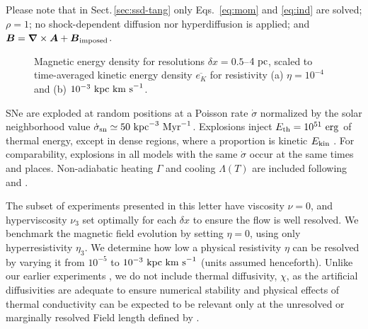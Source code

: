 \documentclass[preprint2]{aastex63}
\newcommand\SNr{\dot\sigma_{\rm sn}}
\newcommand\ESK{E_{\rm kin}}
\newcommand\EST{E_{\rm th}}
\newcommand{\vect}[1]{{{\mbox{\boldmath $#1$}}}}%
\newcommand\kpc{~ {\rm kpc}}
\newcommand\pc{~ {\rm pc}}
\newcommand\dx{ {\delta x}}
\newcommand\Myr{~ {\rm Myr}}
\newcommand\erg{~ {\rm erg}}
\newcommand\kms{~ {\rm km~ s}^{-1}}
\begin{document}
Please note that in Sect.\,\ref{sec:ssd-tang} only Eqs.~\eqref{eq:mom} and
\eqref{eq:ind} are solved; $\rho=1$; no shock-dependent diffusion nor
hyperdiffusion is applied; and $\vect{B}=\vect\nabla\times\vect{A}+
\vect{B}_{\rm imposed}$.

\begin{figure*}
\caption{
 Magnetic energy density for resolutions $\dx=0.5$--$4\pc$,
 scaled to time-averaged kinetic energy density $\overline{e_K}$ for resistivity
 (a) $\eta=10^{-4}$ and (b) $10^{-3}\kpc\kms$.
\label{fig:eb-res}}
\end{figure*}

 SNe are exploded at random positions at a Poisson rate $\dot\sigma$
 normalized by the solar neighborhood value $\SNr\simeq 50\kpc^{-3}\Myr^{-1}$.
 Explosions inject $\EST = 10^{51}\erg$ of thermal energy, except in
 dense regions, where
 a proportion is kinetic $\ESK$ 
 \citep[see][]{GMKSH20}.
 For comparability,
    explosions in all models with the same $\dot\sigma$ occur at the same
    times and places.
 Non-adiabatic heating $\Gamma$ and cooling $\Lambda (T)$ are
 included \citep{Gent:2013a} following \citet{Wolfire:1995} and
 \citet{Sarazin:1987}.

 The subset of experiments presented in this letter have viscosity $\nu=0$,
 and hyperviscosity $\nu_3$ set optimally for each $\dx$ to ensure the flow
 is well resolved.
 We benchmark the magnetic field evolution by setting $\eta=0$, using only
 hyperresistivity $\eta_3$.
 We determine how low a physical resistivity $\eta$ can be resolved by varying
 it from $10^{-5}$ to $10^{-3}\kpc\kms$ (units assumed henceforth).
 Unlike our earlier experiments \citep{Gent:2013a,Gent:2013b,GMKSH20},
 we do not include thermal diffusivity, $\chi$, as the artificial diffusivities
 are adequate to ensure numerical stability and physical effects of thermal
 conductivity can be expected to be relevant only at the unresolved or
 marginally resolved Field length defined by \citet[][named after George
 Field, not the magnetic field]{BM90}.
\end{document}
